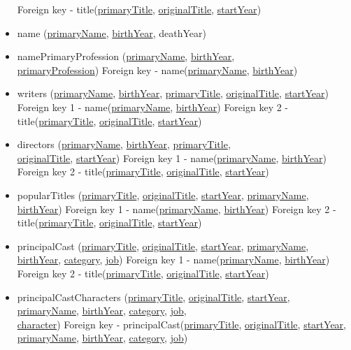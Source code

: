 \documentclass{sig-alternate}
\begin{document}
\begin{itemize}
	Foreign key - title(\underline{primaryTitle}, \underline{originalTitle}, \underline{startYear})
	\item name (\underline{primaryName}, \underline{birthYear}, deathYear)
	\item namePrimaryProfession (\underline{primaryName}, \underline{birthYear},\\ \underline{primaryProfession}) \newline
	Foreign key - name(\underline{primaryName}, \underline{birthYear})
	\item writers (\underline{primaryName}, \underline{birthYear}, \underline{primaryTitle}, \underline{originalTitle}, \underline{startYear}) \newline
	Foreign key 1 - name(\underline{primaryName}, \underline{birthYear}) \newline
	Foreign key 2 - title(\underline{primaryTitle}, \underline{originalTitle}, \underline{startYear})
	\item directors (\underline{primaryName}, \underline{birthYear}, \underline{primaryTitle},\\ \underline{originalTitle}, \underline{startYear}) \newline
	Foreign key 1 - name(\underline{primaryName}, \underline{birthYear}) \newline
	Foreign key 2 - title(\underline{primaryTitle}, \underline{originalTitle}, \underline{startYear})
	\item popularTitles (\underline{primaryTitle}, \underline{originalTitle}, \underline{startYear}, \underline{primaryName}, \underline{birthYear}) \newline
	Foreign key 1 - name(\underline{primaryName}, \underline{birthYear}) \newline
	Foreign key 2 - title(\underline{primaryTitle}, \underline{originalTitle}, \underline{startYear})
	\item principalCast (\underline{primaryTitle}, \underline{originalTitle}, \underline{startYear}, \underline{primaryName}, \underline{birthYear}, \underline{category}, \underline{job}) \newline
	Foreign key 1 - name(\underline{primaryName}, \underline{birthYear}) \newline
	Foreign key 2 - title(\underline{primaryTitle}, \underline{originalTitle}, \underline{startYear})
	\item principalCastCharacters (\underline{primaryTitle}, \underline{originalTitle}, \underline{startYear}, \underline{primaryName}, \underline{birthYear}, \underline{category}, \underline{job},\\ \underline{character}) \newline
	Foreign key - principalCast(\underline{primaryTitle}, \underline{originalTitle}, \underline{startYear}, \underline{primaryName}, \underline{birthYear}, \underline{category}, \underline{job})
        \end{itemize}
\end{document}
